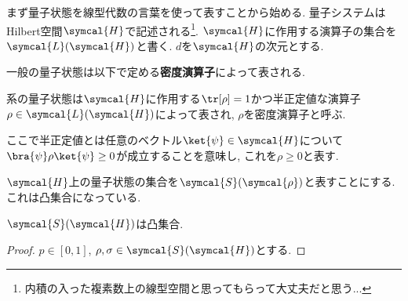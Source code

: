 
まず量子状態を線型代数の言葉を使って表すことから始める. 
量子システムはHilbert空間$\symcal{H}$で記述される\footnote{内積の入った複素数上の線型空間と思ってもらって大丈夫だと思う...}. 
$\symcal{H}$に作用する演算子の集合を$\symcal{L}(\symcal{H})$と書く. 
$d$を$\symcal{H}$の次元とする. 


一般の量子状態は以下で定める\textbf{密度演算子}によって表される. 
\begin{mydfn}[量子状態]
  系の量子状態は$\symcal{H}$に作用する$\tr[\rho]=1$かつ半正定値な演算子$\rho\in\symcal{L}(\symcal{H})$によって表され, $\rho$を密度演算子と呼ぶ. 
\end{mydfn}
ここで半正定値とは任意のベクトル$\ket{\psi}\in\symcal{H}$について$\bra{\psi}\rho\ket{\psi}\geq 0$が成立することを意味し, これを$\rho\geq 0$と表す. 

$\symcal{H}$上の量子状態の集合を$\symcal{S}(\symcal{\rho})$と表すことにする. 
これは凸集合になっている. 
\begin{myprop}
  $\symcal{S}(\symcal{H})$は凸集合. 
\end{myprop}
\begin{proof}
  $p\in [0,1]$, $\rho, \sigma\in\symcal{S}(\symcal{H})$とする. 
\end{proof}

